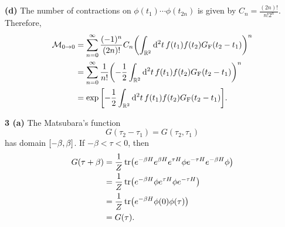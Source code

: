 \documentclass{article}
\makeatletter
\newcommand*{\shifttext}[1]{%
  \settowidth{\@tempdima}{#1}%
  \hspace{-\@tempdima}#1%
}
\newcommand{\plabel}[1]{%
\shifttext{\textbf{#1}\quad}%
}
\newcommand{\prule}{%
\begin{center}%
\hdashrule[0.5ex]{.99\linewidth}{1pt}{1pt 2.5pt}%
\end{center}%
}
\makeatother
\begin{document}
\plabel{(d)}%
The number of contractions on $\phi(t_1) \cdots \phi(t_{2n})$ is given by $C_n = \displaystyle \frac{(2n)!}{n! 2^{n}}$.
Therefore,
\begin{align*}
    \mathcal{M}_{0\rightarrow 0} &= \sum_{n=0}^\infty \frac{(-1)^n}{(2n)!} C_n \qty(\int_{\mathbb{R}^{2}} \dd[2]{t} f(t_1) f(t_2) G_{\mathrm{F}}(t_2 - t_1))^n \\
    &= \sum_{n=0}^\infty \frac{1}{n!} \qty(-\frac{1}{2}\int_{\mathbb{R}^{2}} \dd[2]{t} f(t_1) f(t_2) G_{\mathrm{F}}(t_2 - t_1))^n \\
    &= \exp\qty[-\frac{1}{2}\int_{\mathbb{R}^{2}} \dd[2]{t} f(t_1) f(t_2) G_{\mathrm{F}}(t_2 - t_1)].
\end{align*}

\prule
\plabel{3 (a)}%
The Matsubara's function
\[ G(\tau_2 - \tau_1) = G(\tau_2, \tau_1) \]
has domain $\qty[-\beta,\beta]$.
If $-\beta < \tau < 0$, then
\begin{align*}
    G(\tau+\beta) &= \frac{1}{Z}\tr(e^{-\beta H} e^{\beta H} e^{\tau H} \phi e^{-\tau H} e^{-\beta H} \phi) \\
    &= \frac{1}{Z}\tr(e^{-\beta H} \phi e^{\tau H} \phi e^{-\tau H}) \\
    &= \frac{1}{Z} \tr(e^{-\beta H} \phi(0) \phi(\tau)) \\
    &= G(\tau).
\end{align*}
\end{document}
